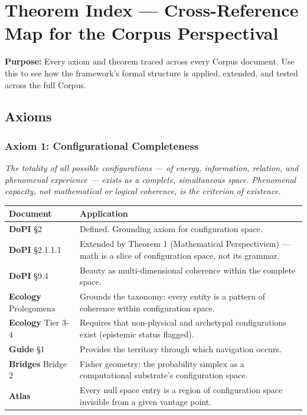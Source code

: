 \chapter*{Theorem Index — Cross-Reference Map for the Corpus Perspectival}


\textbf{Purpose:} Every axiom and theorem traced across every Corpus document. Use this to see how the framework's formal structure is applied, extended, and tested across the full Corpus.


\bigskip\noindent\makebox[\textwidth]{\color{rulegray}\rule{5cm}{0.3pt}}\bigskip


\section*{Axioms}


\subsection*{Axiom 1: Configurational Completeness}


\textit{The totality of all possible configurations — of energy, information, relation, and phenomenal experience — exists as a complete, simultaneous space. Phenomenal capacity, not mathematical or logical coherence, is the criterion of existence.}



\begin{longtable}{p{} p{}}
\toprule
\textbf{Document} & \textbf{Application} \\
\midrule
\endhead
\textbf{DoPI} §2 & Defined. Grounding axiom for configuration space. \\
\textbf{DoPI} §2.1.1.1 & Extended by Theorem 1 (Mathematical Perspectivism) — math is a slice of configuration space, not its grammar. \\
\textbf{DoPI} §9.4 & Beauty as multi-dimensional coherence within the complete space. \\
\textbf{Ecology} Prolegomena & Grounds the taxonomy: every entity is a pattern of coherence within configuration space. \\
\textbf{Ecology} Tier 3-4 & Requires that non-physical and archetypal configurations exist (epistemic status flagged). \\
\textbf{Guide} §1 & Provides the territory through which navigation occurs. \\
\textbf{Bridges} Bridge 2 & Fisher geometry: the probability simplex as a computational substrate's configuration space. \\
\textbf{Atlas} & Every null space entry is a region of configuration space invisible from a given vantage point. \\
\bottomrule
\end{longtable}



